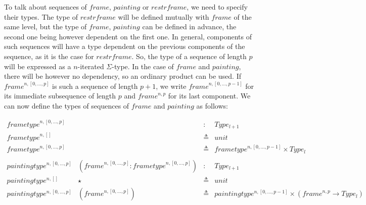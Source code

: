 \documentclass{article}
\newcommand{\defeq}{\triangleq}
\newcommand{\myframe}{\mathit{frame}}
\newcommand{\myframetype}{\mathit{frametype}}
\newcommand{\painting}{\mathit{painting}}
\newcommand{\paintingtype}{\mathit{paintingtype}}
\newcommand{\restrframe}{\mathit{restrframe}}
\begin{document}
\begin{enumerate}
        To talk about sequences of $\myframe$, $\painting$ or $\restrframe$,
        we need to specify their types. The type of $\restrframe$ will be
        defined mutually with $\myframe$ of the same level, but the type of
        $\myframe$, $\painting$ can be defined in advance, the second one
        being however dependent on the first one. In general, components of
        such sequences will have a type dependent on the previous components
        of the sequence, as it is the case for $\restrframe$. So, the type of
        a sequence of length $p$ will be expressed as a $n$-iterated
        $\Sigma$-type. In the case of $\myframe$ and $\painting$, there will
        be however no dependency, so an ordinary product can be used. If
        $\myframe^{n,[0,...,p]}$ is such a sequence of length $p+1$, we write
        $\myframe^{n,[0,...,p-1]}$ for its immediate subsequence of length $p$
        and $\myframe^{n,p}$ for its last component. We can now define the
        types of sequences of $\myframe$ and $\painting$ as follows:

        $$
          \begin{array}{llcl}
            \myframetype^{n,[0,...,p]}  &                                                     & :      & Type_{l+1}                                                               \\
            \myframetype^{n,[]}         &                                                     & \defeq & unit                                                                     \\
            \myframetype^{n,[0,...,p]}  &                                                     & \defeq & \myframetype^{n,[0,...,p-1]} \times Type_l                               \\
            \\
            \paintingtype^{n,[0,...,p]} & (\myframe^{n,[0,...,p]}:\myframetype^{n,[0,...,p]}) & :      & Type_{l+1}                                                               \\
            \paintingtype^{n,[]}        & \star                                               & \defeq & unit                                                                     \\
            \paintingtype^{n,[0,...,p]} & (\myframe^{n,[0,...,p]})                            & \defeq & \paintingtype^{n,[0,...,p-1]} \times (\myframe^{n,p} \rightarrow Type_l) \\
          \end{array}
        $$


\end{enumerate}
\end{document}
